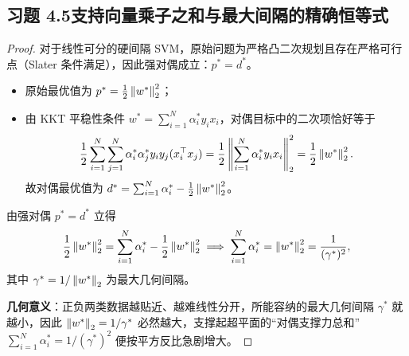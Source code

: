 \subsection*{习题 4.5\quad 支持向量乘子之和与最大间隔的精确恒等式}
\begin{proof}
对于线性可分的硬间隔 SVM，原始问题为严格凸二次规划且存在严格可行点（Slater 条件满足），因此强对偶成立：$p^* = d^*$。
\begin{itemize}
  \item 原始最优值为 $p^* = \frac{1}{2}\left\|w^*\right\|_2^2$；
  \item 由 KKT 平稳性条件 $w^* = \sum_{i=1}^N \alpha_i^* y_i x_i$，对偶目标中的二次项恰好等于
  \[
    \frac{1}{2}\sum_{i=1}^N\sum_{j=1}^N \alpha_i^* \alpha_j^* y_i y_j (x_i^\top x_j)
    = \frac{1}{2}\left\|\sum_{i=1}^N \alpha_i^* y_i x_i\right\|_2^2
    = \frac{1}{2}\left\|w^*\right\|_2^2.
  \]
  故对偶最优值为 $d^* = \sum_{i=1}^N \alpha_i^* - \frac{1}{2}\left\|w^*\right\|_2^2$。
\end{itemize}
由强对偶 $p^* = d^*$ 立得
\[
  \frac{1}{2}\left\|w^*\right\|_2^2 = \sum_{i=1}^N \alpha_i^* - \frac{1}{2}\left\|w^*\right\|_2^2
  \implies \sum_{i=1}^N \alpha_i^* = \left\|w^*\right\|_2^2 = \frac{1}{(\gamma^*)^2},
\]
其中 $\gamma^* = 1/\left\|w^*\right\|_2$ 为最大几何间隔。

\textbf{几何意义}：正负两类数据越贴近、越难线性分开，所能容纳的最大几何间隔 $\gamma^*$ 就越小，因此 $\left\|w^*\right\|_2 = 1/\gamma^*$ 必然越大，支撑起超平面的“对偶支撑力总和” $\sum_{i=1}^N \alpha_i^* = 1/(\gamma^*)^2$ 便按平方反比急剧增大。
\end{proof}

